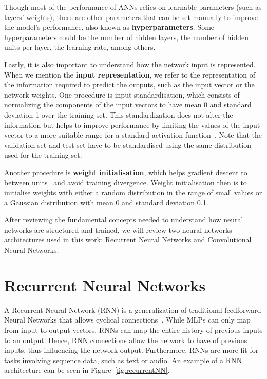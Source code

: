 Though most of the performance of ANNs relies on learnable parameters (such as layers’ weights), 
there are other parameters that can be set manually to improve the model’s performance, also 
known as \textbf{hyperparameters}. Some hyperparameters could be the number of hidden layers, 
the number of hidden units per layer, the learning rate, among others.

Lastly, it is also important to understand how the network input is represented. When we 
mention the \textbf{input representation}, we refer to the representation of the information 
required to predict the outputs, such as the input vector or the network weights. One 
procedure is input standardisation, which consists of normalizing the components of the input 
vectors to have mean 0 and standard deviation 1 over the training set. This standardization 
does not alter the information but helps to improve performance by limiting the values of the 
input vector to a more suitable range for a standard activation function~\cite{appendix:lecun1998efficient}. 
Note that the validation set and test set have to be standardised using the same distribution 
used for the training set. 

Another procedure is \textbf{weight initialisation}, which helps gradient descent to 
 between units~\cite{appendix:lecun1998efficient} and avoid training 
divergence. Weight initialisation then is to initialise weights with either a random 
distribution in the range of small values or a Gaussian distribution with mean 0 and 
standard deviation 0.1.

After reviewing the fundamental concepts needed to understand how neural networks are 
structured and trained, we will review two neural networks architectures used in this work: 
Recurrent Neural Networks and Convolutional Neural Networks.

\section{Recurrent Neural Networks}
\label{appendix:neuralNetworks/rnn}
A Recurrent Neural Network (RNN) is a generalization of traditional feedforward Neural 
Networks that allows cyclical connections~\cite{seqlab:Graves2012-385}. While MLPs can only 
map from input to output vectors, RNNs can map the entire history of previous inputs to an 
output. Hence, RNN connections allow the network to have  of previous inputs, thus 
influencing the network output. Furthermore, RNNs are more fit for tasks involving sequence 
data, such as text or audio. An example of a RNN architecture can be seen in Figure~\ref{fig:recurrentNN}.

